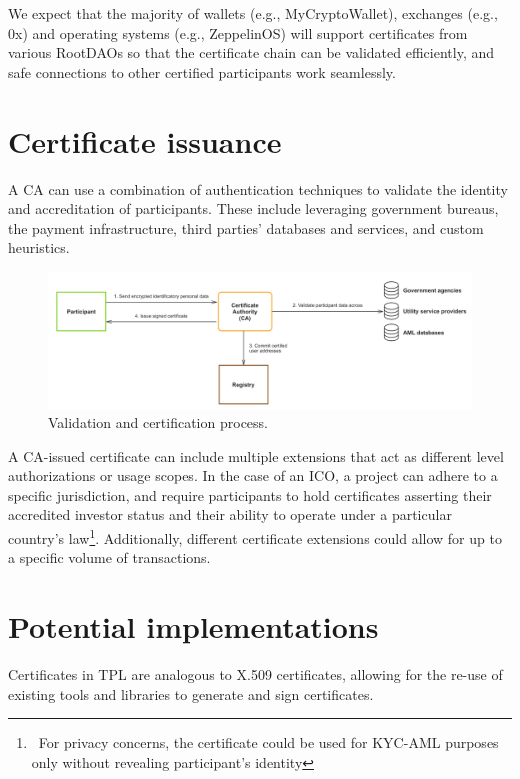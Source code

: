 \documentclass[10pt]{article}
\begin{document}
\noindent We expect that the majority of wallets (e.g., MyCryptoWallet), exchanges (e.g., 0x) and operating systems (e.g., ZeppelinOS) will support certificates from various RootDAOs so that the certificate chain can be validated efficiently, and safe connections to other certified participants work seamlessly.\\

\section{Certificate issuance}
A CA can use a combination of authentication techniques to validate the identity and accreditation of participants. These include leveraging government bureaus, the payment infrastructure, third parties' databases and services, and custom heuristics. \\

\begin{figure}[ht]
    \centering
    \includegraphics[width=\linewidth]{figures/figure2.png}
    \caption{Validation and certification process.}
    \label{fig:fig2}
\end{figure}

\noindent A CA-issued certificate can include multiple extensions that act as different level authorizations or usage scopes. In the case of an ICO, a project can adhere to a specific jurisdiction, and require participants to hold certificates asserting their accredited investor status and their ability to operate under a particular country’s law\footnote{\ For privacy concerns, the certificate could be used for KYC-AML purposes only without revealing participant’s identity}. Additionally, different certificate extensions could allow for up to a specific volume of transactions.\\

\section{Potential implementations}
Certificates in TPL are analogous to X.509 certificates\cite{x509}, allowing for the re-use of existing tools and libraries to generate and sign certificates.\\
\end{document}
